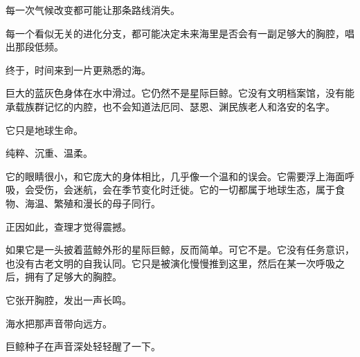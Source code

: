 每一次气候改变都可能让那条路线消失。

每一个看似无关的进化分支，都可能决定未来海里是否会有一副足够大的胸腔，唱出那段低频。

终于，时间来到一片更熟悉的海。

巨大的蓝灰色身体在水中滑过。它仍然不是星际巨鲸。它没有文明档案馆，没有能承载族群记忆的内腔，也不会知道法厄同、瑟恩、渊民族老人和洛安的名字。

它只是地球生命。

纯粹、沉重、温柔。

它的眼睛很小，和它庞大的身体相比，几乎像一个温和的误会。它需要浮上海面呼吸，会受伤，会迷航，会在季节变化时迁徙。它的一切都属于地球生态，属于食物、海温、繁殖和漫长的母子同行。

正因如此，查理才觉得震撼。

如果它是一头披着蓝鲸外形的星际巨鲸，反而简单。可它不是。它没有任务意识，也没有古老文明的自我认同。它只是被演化慢慢推到这里，然后在某一次呼吸之后，拥有了足够大的胸腔。

它张开胸腔，发出一声长鸣。

海水把那声音带向远方。

巨鲸种子在声音深处轻轻醒了一下。
